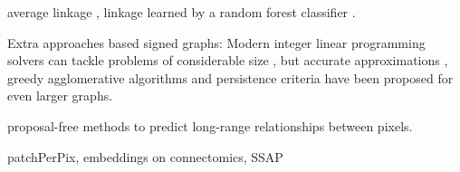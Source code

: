 \TODO{}
 average linkage \cite{liu2018affinity,lee2017superhuman}, linkage learned by a random forest classifier \cite{nunez2013machine,knowles2016rhoananet}.


Extra approaches based signed graphs: Modern integer linear programming solvers can tackle problems of considerable size \cite{andres2012globally}, but accurate approximations \cite{pape2017solving,beier2016efficient,yarkony2012fast}, greedy agglomerative algorithms \cite{levinkov2017comparative,wolf2019mutex,keuper2015efficient,kardoostsolving} and persistence criteria \cite{lange2018partial,lange2018combinatorial} have been proposed for even larger graphs. 


proposal-free methods \cite{liu2018affinity,wolf2018mutex,lee2017superhuman} to predict long-range relationships between pixels.

\TODO{} patchPerPix, embeddings on connectomics, SSAP


